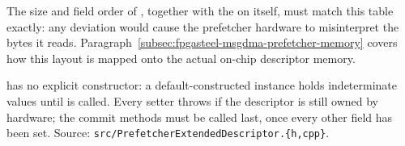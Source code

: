 The size and field order of , together with the  on  itself, must match this table exactly: any deviation would cause the prefetcher hardware to misinterpret the bytes it reads. Paragraph~\ref{subsec:fpgasteel-msgdma-prefetcher-memory} covers how this layout is mapped onto the actual on-chip descriptor memory.

 has no explicit constructor: a default-constructed instance holds indeterminate values until  is called. Every setter throws  if the descriptor is still owned by hardware; the commit methods must be called last, once every other field has been set. Source: \lstinline[style=inlineFsRepo]!src/PrefetcherExtendedDescriptor.{h,cpp}!.

